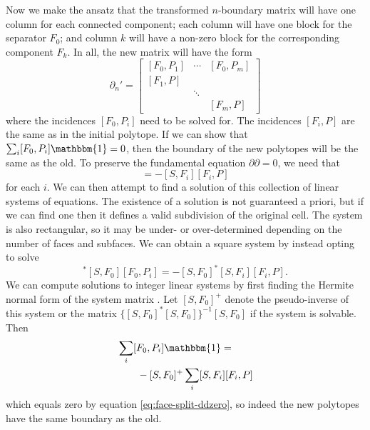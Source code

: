 \documentclass[twocolumn,leqno,twocolumn]{article}
\begin{document}
Now we make the ansatz that the transformed $n$-boundary matrix will have one column for each connected component; each column will have one block for the separator $F_0$; and column $k$ will have a non-zero block for the corresponding component $F_k$.
In all, the new matrix will have the form
\begin{equation}
    \partial_n' = \left[\begin{matrix}[F_0, P_1] & \cdots & [F_0, P_m] \\ [F_1, P] & & \\ & \ddots & \\ & & [F_m, P]\end{matrix}\right]
    \label{eq:face-split-partial-n}
\end{equation}
where the incidences $[F_0, P_i]$ need to be solved for.
The incidences $[F_i, P]$ are the same as in the initial polytope.
If we can show that $\sum_i[F_0, P_i]\mathbbm{1} = 0$, then the boundary of the new polytopes will be the same as the old.
To preserve the fundamental equation $\partial\partial = 0$, we need that
\begin{equation}
    [S, F_0][F_0, P_i] = -[S, F_i][F_i, P]
    \label{eq:face-split-s-f0}
\end{equation}
for each $i$.
We can then attempt to find a solution of this collection of linear systems of equations.
The existence of a solution is not guaranteed a priori, but if we can find one then it defines a valid subdivision of the original cell.
The system is also rectangular, so it may be under- or over-determined depending on the number of faces and subfaces.
We can obtain a square system by instead opting to solve
\begin{equation}
    [S, F_0]^*[S, F_0][F_0, P_i] = -[S, F_0]^*[S, F_i][F_i, P].
    \label{eq:face-split-normal-eqn}
\end{equation}
We can compute solutions to integer linear systems by first finding the Hermite normal form of the system matrix \cite{kannan1979polynomial}.
Let $[S, F_0]^+$ denote the pseudo-inverse of this system or the matrix $\{[S, F_0]^*[S, F_0]\}^{-1}[S, F_0]$ if the system is solvable.
Then
\begin{align}
    & \sum_i[F_0, P_i]\mathbbm{1} = \nonumber\\
    & \quad\quad -[S, F_0]^+\sum_i[S, F_i][F_i, P]
\end{align}
which equals zero by equation \eqref{eq:face-split-ddzero}, so indeed the new polytopes have the same boundary as the old.
\end{document}

